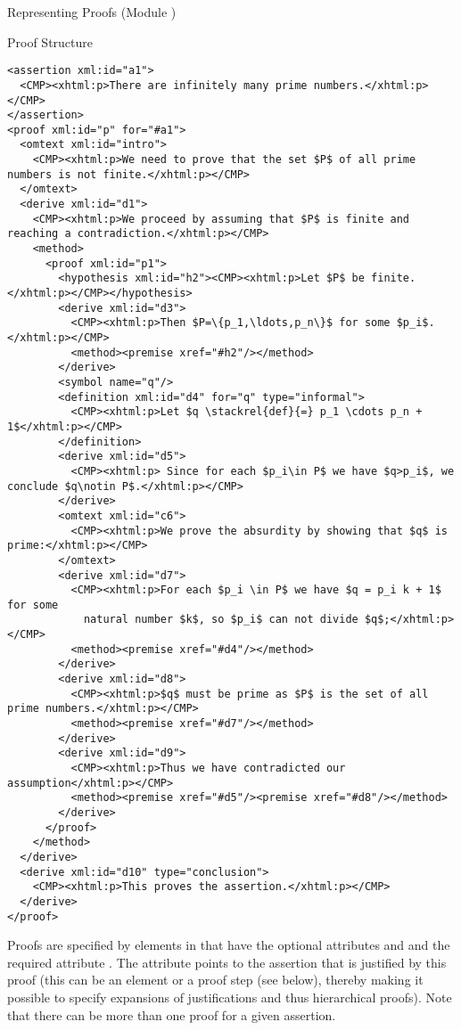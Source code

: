 \begin{tchapter}[id=proofs,short=Representing Proofs]{Representing Proofs (Module {})}
\begin{tsection}[id=proof-text]{Proof Structure}
\begin{lstlisting}[label=lst:primes-omdoc-text,mathescape,
  caption={An {\omdoc} Representation of {\myfigref{pf-example1-math}}.},
  index={symbol,definition}]
<assertion xml:id="a1">
  <CMP><xhtml:p>There are infinitely many prime numbers.</xhtml:p></CMP>
</assertion>
<proof xml:id="p" for="#a1">
  <omtext xml:id="intro">
    <CMP><xhtml:p>We need to prove that the set $P$ of all prime numbers is not finite.</xhtml:p></CMP>
  </omtext>
  <derive xml:id="d1">
    <CMP><xhtml:p>We proceed by assuming that $P$ is finite and reaching a contradiction.</xhtml:p></CMP>
    <method>
      <proof xml:id="p1">
        <hypothesis xml:id="h2"><CMP><xhtml:p>Let $P$ be finite.</xhtml:p></CMP></hypothesis>
        <derive xml:id="d3">
          <CMP><xhtml:p>Then $P=\{p_1,\ldots,p_n\}$ for some $p_i$.</xhtml:p></CMP>
          <method><premise xref="#h2"/></method>
        </derive>
        <symbol name="q"/>
        <definition xml:id="d4" for="q" type="informal">
          <CMP><xhtml:p>Let $q \stackrel{def}{=} p_1 \cdots p_n + 1$</xhtml:p></CMP>
        </definition>
        <derive xml:id="d5">
          <CMP><xhtml:p> Since for each $p_i\in P$ we have $q>p_i$, we conclude $q\notin P$.</xhtml:p></CMP>
        </derive>  
        <omtext xml:id="c6">
          <CMP><xhtml:p>We prove the absurdity by showing that $q$ is prime:</xhtml:p></CMP>
        </omtext>  
        <derive xml:id="d7">
          <CMP><xhtml:p>For each $p_i \in P$ we have $q = p_i k + 1$ for some
            natural number $k$, so $p_i$ can not divide $q$;</xhtml:p></CMP>
          <method><premise xref="#d4"/></method>
        </derive>
        <derive xml:id="d8">
          <CMP><xhtml:p>$q$ must be prime as $P$ is the set of all prime numbers.</xhtml:p></CMP> 
          <method><premise xref="#d7"/></method>
        </derive>
        <derive xml:id="d9">
          <CMP><xhtml:p>Thus we have contradicted our assumption</xhtml:p></CMP>
          <method><premise xref="#d5"/><premise xref="#d8"/></method>
        </derive>  
      </proof>
    </method>
  </derive>  
  <derive xml:id="d10" type="conclusion">
    <CMP><xhtml:p>This proves the assertion.</xhtml:p></CMP>
  </derive>  
</proof>
\end{lstlisting}

Proofs are specified by {} elements in {\omdoc} that have the optional
attributes {} and {} and the
required attribute {}. The {} attribute points
to the assertion that is justified by this proof (this can be an {}
element or a {} proof step (see below), thereby making it possible to
specify expansions of justifications and thus hierarchical proofs). Note that there can be
more than one proof for a given assertion.


\end{tsection}
\end{tchapter}
